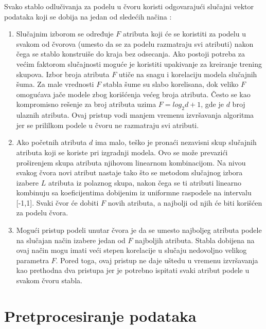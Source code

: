 \documentclass[12pt,oneside]{memoir}
\begin{document}
Svako stablo odlučivanja za podelu u čvoru koristi odgovarajući slučajni vektor podataka koji se dobija na jedan od sledećih načina \cite{mitic}:
\begin{enumerate}[1)]
\item Slučajnim izborom se određuje $F$ atributa koji će se koristiti za podelu u svakom od čvorova (umesto da se za podelu razmatraju svi atributi) nakon čega se stablo konstruiše do kraja bez odsecanja. Ako postoji potreba za većim faktorom slučajnosti moguće je koristiti upakivanje za kreiranje trening skupova. Izbor broja atributa $F$ utiče na snagu i korelaciju modela slučajnih šuma. Za male vrednosti $F$ stabla šume su slabo korelisana, dok veliko $F$ omogućava jače modele zbog korišćenja većeg broja atributa. Često se kao kompromisno rešenje za broj atributa uzima $F=log_2d+1$, gde je $d$ broj ulaznih atributa. Ovaj pristup vodi manjem vremenu izvršavanja algoritma jer se prililkom podele u čvoru ne razmatraju svi atributi. 
\item Ako početnih atributa $d$ ima malo, teško je pronaći nezavisni skup slučajnih atributa koji se koriste pri izgradnji modela. Ovo se može prevazići proširenjem skupa atributa njihovom linearnom kombinacijom. Na nivou svakog čvora novi atribut nastaje tako što se metodom slučajnog izbora izabere $L$ atributa iz polaznog skupa, nakon čega se ti atributi linearno kombinuju sa koeficijentima dobijenim iz uniformne raspodele na intervalu [-1,1]. Svaki čvor će dobiti $F$ novih atributa, a najbolji od njih će biti korišćen za podelu čvora. 
\item Mogući pristup podeli unutar čvora je da se umesto najboljeg atributa podele na slučajan način izabere jedan od $F$ najboljih atributa. Stabla dobijena na ovaj način mogu imati veći stepen korelacije u slučaju nedovoljno velikog parametra $F$. Pored toga, ovaj pristup ne daje uštedu u vremenu izvršavanja kao prethodna dva pristupa jer je potrebno ispitati svaki atribut podele u svakom čvoru stabla. 
\end{enumerate}

\section{Pretprocesiranje podataka}
\label{sec:pretprocesiranje}
\end{document}
